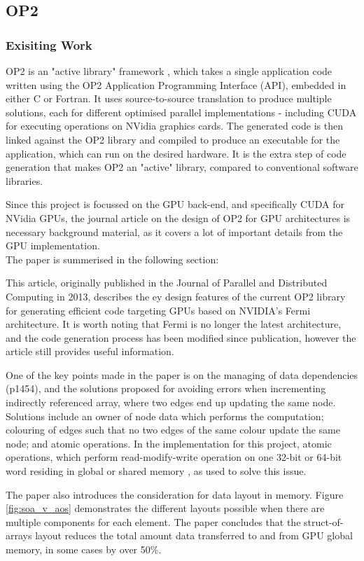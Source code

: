 \subsection{OP2}

\subsubsection{Exisiting Work}

OP2 is an "active library" framework \cite{op2main}, which takes a single application code written using the OP2 Application Programming Interface (API), embedded in either C or Fortran. It uses source-to-source translation to produce multiple solutions, each for different optimised parallel implementations - including CUDA for executing operations on NVidia graphics cards. The generated code is then linked against the OP2 library and compiled to produce an executable for the application, which can run on the desired hardware. It is the extra step of code generation that makes OP2 an "active" library, compared to conventional software libraries.
\par
Since this project is focussed on the GPU back-end, and specifically CUDA for NVidia GPUs, the journal article on the design of OP2 for GPU architectures \cite{gpudesign} is necessary background material, as it covers a lot of important details from the GPU implementation.\\ The paper is summerised in the following section:

This article, originally published in the Journal of Parallel and Distributed Computing in 2013, describes the ey design features of the current OP2 library for generating efficient code targeting GPUs based on NVIDIA’s Fermi architecture. It is worth noting that Fermi is no longer the latest architecture, and the code generation process has been modified since publication, however the article still provides useful information.
\par
One of the key points made in the paper is on the managing of data dependencies (p1454), and the solutions proposed for avoiding errors when incrementing indirectly referenced array, where two edges end up updating the same node. Solutions include an owner of node data which performs the computation; colouring of edges such that no two edges of the same colour update the same node; and atomic operations. In the implementation for this project, atomic operations, which perform read-modify-write operation on one 32-bit or 64-bit word residing in global or shared memory \cite[p96]{guide}, as used to solve this issue.
\par
The paper also introduces the consideration for data layout in memory. Figure \ref{fig:soa_v_aos} demonstrates the different layouts possible when there are multiple components for each element. The paper concludes that the struct-of-arrays layout reduces the total amount data transferred to and from GPU global memory, in some cases by over 50\%.

